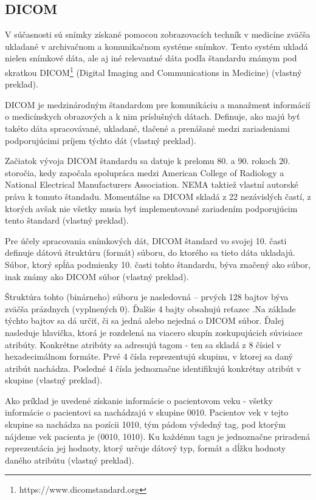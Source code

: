 \subsection {DICOM}\label{dicom}
V súčasnosti sú snímky získané pomocou zobrazovacích techník v medicíne zväčša ukladané v archivačnom a komunikačnom systéme snímkov. Tento systém ukladá nielen snímkové dáta, ale aj iné relevantné dáta podľa štandardu známym pod skratkou DICOM\footnote{https://www.dicomstandard.org} (Digital Imaging and Communications in Medicine) \cite{Varma_2012} (vlastný preklad).

DICOM je medzinárodným štandardom pre komunikáciu a manažment informácií o medicínskych obrazových a k nim príslušných dátach. Definuje, ako majú byť takéto dáta spracovávané, ukladané, tlačené a prenášané medzi zariadeniami podporujúcimi príjem týchto dát \cite{about_dicomlibrary} (vlastný preklad).

Začiatok vývoja DICOM štandardu sa datuje k prelomu 80. a 90. rokoch 20. storočia, kedy započala spolupráca medzi American College of Radiology a National Electrical Manufacturers Association. NEMA taktiež vlastní autorské práva k tomuto štandadu. Momentálne sa DICOM skladá z 22 nezávislých častí, z ktorých avšak nie všetky musia byť implementované zariadením podporujúcim tento štandard \cite{dicom_history} (vlastný preklad).

\clearpage

Pre účely spracovania snímkových dát, DICOM štandard vo svojej 10. časti definuje dátovú štruktúru (formát) súboru, do ktorého sa tieto dáta ukladajú. Súbor, ktorý spĺňa podmienky 10. časti tohto štandardu, býva značený ako  súbor, inak známy ako DICOM súbor \cite{Varma_2012} (vlastný preklad).

Štruktúra tohto (binárneho) súboru je nasledovná -- prvých 128 bajtov býva zväčša prázdnych (vyplnených 0). Ďalšie 4 bajty obsahujú reťazec .\newline Na základe týchto bajtov sa dá určiť, či sa jedná alebo nejedná o DICOM súbor. Ďalej nasleduje hlavička, ktorá je rozdelená na viacero skupín zoskupujúcich súvisiace atribúty. Konkrétne atribúty sa adresujú tagom - ten sa skladá z 8 čísiel v hexadecimálnom formáte. Prvé 4 čísla reprezentujú skupinu, v ktorej sa daný atribút nachádza. Posledné 4 čísla jednoznačne identifikujú konkrétny atribút v skupine \cite{Varma_2012} (vlastný preklad).

Ako príklad je uvedené získanie informácie o pacientovom veku - všetky informácie o pacientovi sa nachádzajú v skupine 0010. Pacientov vek v tejto skupine sa nachádza na pozícii 1010, tým pádom výsledný tag, pod ktorým nájdeme vek pacienta je (0010, 1010). Ku každému tagu je jednoznačne priradená reprezentácia jej hodnoty, ktorý určuje dátový typ, formát a dĺžku hodnoty daného atribútu  \cite{Varma_2012} (vlastný preklad).

